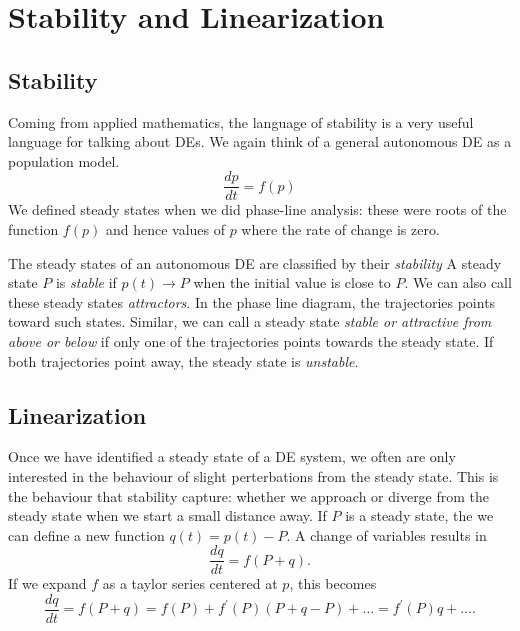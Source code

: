 \documentclass[fleqn,letterpaper]{report}
\begin{document}
\section{Stability and Linearization}
\label{stability-and-linearization}

\subsection{Stability}
\label{stability}

Coming from applied mathematics, the language of stability is
a very useful language for talking about DEs. We again think
of a general autonomous DE as a population model.
\begin{equation*}
\frac{dp}{dt} = f(p)
\end{equation*}
We defined steady states when we did phase-line analysis:
these were roots of the function $f(p)$ and hence values of
$p$ where the rate of change is zero. 

\begin{defn}
The steady states of an autonomous DE are classified by their
\emph{stability} A steady state $P$ is \emph{stable} if $p(t)
\rightarrow P$ when the initial value is close to $P$. We can
also call these steady states \emph{attractors}. In the phase
line diagram, the trajectories points toward such states.
Similar, we can call a steady state \emph{stable or attractive
from above or below} if only one of the trajectories points
towards the steady state. If both trajectories point away, the
steady state is \emph{unstable}.
\end{defn}

\subsection{Linearization}
\label{linearization}

Once we have identified a steady state of a DE system, we
often are only interested in the behaviour of slight
perterbations from the steady state. This is the behaviour
that stability capture: whether we approach or diverge from
the steady state when we start a small distance away. If
$P$ is a steady state, the we can define a new function $q(t)
= p(t) - P$. A change of variables results in 
\begin{equation*}
\frac{dq}{dt} = f(P + q).
\end{equation*}
If we expand $f$ as a taylor series centered at $p$, this becomes
\begin{equation*}
\frac{dq}{dt} = f(P + q) = f(P) + f^\prime(P) (P+q -P) +
\ldots = f^\prime(P) q + \ldots.
\end{equation*}
\end{document}
